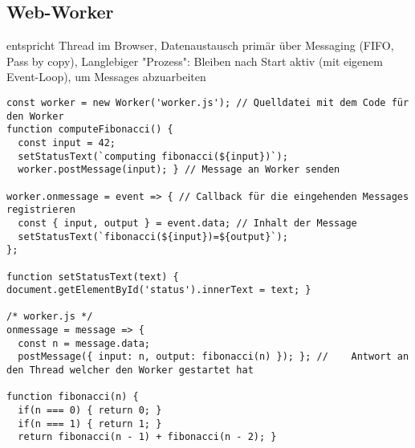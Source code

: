 \subsection{Web-Worker} entspricht Thread im Browser, Datenaustausch primär über Messaging (FIFO, Pass by copy), Langlebiger "Prozess": Bleiben nach Start aktiv (mit eigenem Event-Loop), um Messages abzuarbeiten

\begin{lstlisting}
const worker = new Worker('worker.js'); // Quelldatei mit dem Code für den Worker
function computeFibonacci() {
  const input = 42;
  setStatusText(`computing fibonacci(${input})`);
  worker.postMessage(input); } // Message an Worker senden

worker.onmessage = event => { // Callback für die eingehenden Messages registrieren
  const { input, output } = event.data; // Inhalt der Message
  setStatusText(`fibonacci(${input})=${output}`);
};

function setStatusText(text) { document.getElementById('status').innerText = text; }

/* worker.js */
onmessage = message => {
  const n = message.data;
  postMessage({ input: n, output: fibonacci(n) }); }; //	Antwort an den Thread welcher den Worker gestartet hat

function fibonacci(n) {
  if(n === 0) { return 0; }
  if(n === 1) { return 1; }
  return fibonacci(n - 1) + fibonacci(n - 2); }
\end{lstlisting}
